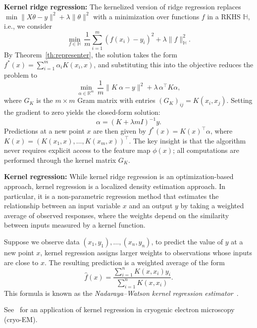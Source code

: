 \noindent
\textbf{Kernel ridge regression:} 
The kernelized version of ridge regression replaces  $\min \|X\theta - y\|^2 + \lambda\|\theta\|^2$ with a minimization over functions $f$ in a RKHS $\mathbb{H}$, i.e., we consider
\begin{equation}
    \min_{f \in \mathbb{H}} \,\frac{1}{m}\sum_{i=1}^m (f(x_i) - y_i)^2 + \lambda \|f\|^2_{\mathbb{H}}.
\end{equation}
By Theorem~\ref{th:representer}, the solution takes the form $f^*(x) = \sum_{i=1}^m \alpha_i K(x_i, x)$, and substituting this into the objective reduces the problem to
\begin{equation}
    \min_{\alpha \in \mathbb{R}^m} \,\frac{1}{m}\|K\ \alpha - y\|^2 + \lambda\, \alpha^\top K \alpha,
\end{equation}
where $G_K$ is the $m \times m$ Gram matrix with entries $(G_K)_{ij} = K(x_i, x_j)$. Setting the gradient to zero yields the closed-form solution:
\begin{equation}
    \alpha = (K + \lambda m I)^{-1}y.
\end{equation}
Predictions at a new point $x$ are then given by $f^*(x) = K(x)^\top \alpha$, where $K(x) = (K(x_1, x), \dots, K(x_m, x))^\top$. The key insight is that the algorithm never requires explicit access to the feature map $\phi(x)$; all computations are performed through the kernel matrix $G_K$.




\medskip
\noindent
\textbf{Kernel regression:}
While kernel ridge regression is an optimization-based approach, kernel regression is a localized density estimation approach. In particular, it is a non-parametric regression method that estimates the relationship between an input variable $x$ and an output $y$ by taking a weighted average of observed responses, where the weights depend on the similarity between inputs measured by a kernel function. 

Suppose we observe data $(x_1,y_1),\dots,(x_n,y_n)$, to predict the value of $y$ at a new point $x$, kernel regression assigns larger weights to observations whose inputs are close to $x$.
The resulting prediction is a weighted average of the form
$$
\hat f(x) = \frac{\sum_{i=1}^{n} K(x,x_i) y_i}
{\sum_{i=1}^{n} K(x,x_i)}.
$$
This formula is known as the {\em Nadaraya–Watson kernel regression estimator}~\cite{nadaraya1964estimating,watson1964smooth}.

See~\cite{gilles2025cryo} for an application of kernel regression in cryogenic electron microscopy (cryo-EM).

